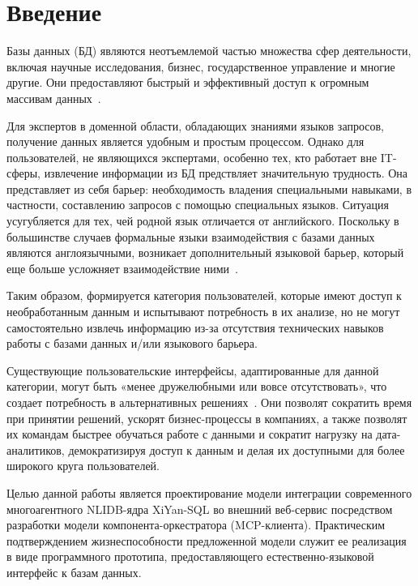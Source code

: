 \chapter*{Введение}
\label{sec:afterwords}

Базы данных (БД) являются неотъемлемой
частью множества сфер деятельности, включая научные исследования, бизнес,
государственное управление и многие другие. Они предоставляют быстрый и
эффективный доступ к огромным массивам данных~\cite{savoskinIssledovanieSposobovPrimeneniya2019}.

Для экспертов в доменной области,
обладающих знаниями языков запросов, получение данных является удобным и простым процессом.
Однако для пользователей, не являющихся экспертами, особенно тех, кто работает
вне IT-сферы, извлечение информации из БД предствляет значительную трудность.
Она представляет из себя барьер: необходимость владения специальными навыками,
в частности, составлению запросов с помощью специальных языков.
Ситуация усугубляется для тех, чей родной язык отличается от
английского. Поскольку в большинстве случаев формальные языки взаимодействия с базами
данных являются англоязычными, возникает дополнительный языковой барьер, который
еще больше усложняет взаимодействие
ними~\cite{karimiNaturalLanguageQuery2022,bolyabkinIntellektualnayaSistemaDlya2021}.

Таким образом, формируется категория пользователей, которые имеют доступ к
необработанным данным и испытывают потребность в их анализе, но не могут самостоятельно
извлечь информацию из-за отсутствия технических навыков работы с базами данных
и/или языкового барьера.

Существующие пользовательские интерфейсы, адаптированные для данной категории,
могут быть «менее дружелюбными или вовсе отсутствовать»,
что создает потребность в альтернативных решениях~\cite{karimiNaturalLanguageQuery2022}.
Они позволят сократить время при принятии решений, ускорят бизнес-процессы в компаниях,
а также позволят их командам быстрее обучаться работе с данными и сократит нагрузку на дата-аналитиков,
демократизируя доступ к данным и делая их доступными для более широкого круга пользователей.

Целью данной работы является проектирование модели интеграции современного
многоагентного NLIDB-ядра XiYan-SQL во внешний веб-сервис посредством
разработки модели компонента-оркестратора (MCP-клиента).
Практическим подтверждением жизнеспособности предложенной модели служит ее
реализация в виде программного прототипа, предоставляющего
естественно-языковой интерфейс к базам данных.

